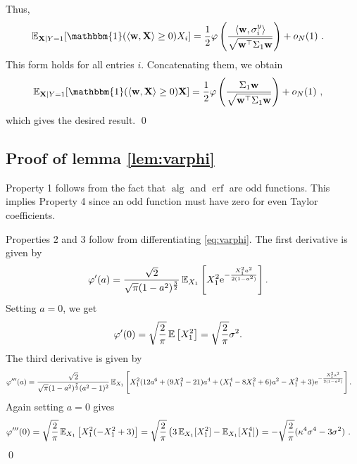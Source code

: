 Thus,
\begin{align*}
    \E_{\mathbf{X} \mid Y=1}[ \mathbbm{1}( \langle \mathbf{w}, \mathbf{X} \rangle \geq 0 ) X_i ]
    &= \frac{1}{2} \varphi \left( \frac{ \langle \mathbf{w}, \sigma_i^y \rangle }{ \sqrt{\mathbf{w}^\top \Sigma_1 \mathbf{w}} } \right) + o_N(1)~.
\end{align*}
This form holds for all entries $i$.
Concatenating them, we obtain
\begin{align*}
    \E_{\mathbf{X} \mid Y=1}[ \mathbbm{1}( \langle \mathbf{w}, \mathbf{X} \rangle \geq 0 ) \mathbf{X} ]
    &= \frac{1}{2} \varphi \left( \frac{ \Sigma_1 \mathbf{w} }{ \sqrt{\mathbf{w}^\top \Sigma_1 \mathbf{w}} } \right) + o_N(1)~,
\end{align*}
which gives the desired result.
\qed

\subsection{Proof of lemma \ref{lem:varphi}} \label{subsec:pf_of_varphi}
Property 1 follows from the fact that $\operatorname{alg}$ and $\operatorname{erf}$ are odd functions.
This implies Property 4 since an odd function must have zero for even Taylor coefficients.

Properties 2 and 3 follow from differentiating \cref{eq:varphi}.
The first derivative is given by
\begin{align*}
    \varphi'(a) &= \frac{\sqrt{2}}{{\sqrt{{\pi}}}(1-a^2)^\frac{3}{2}} \operatorname{\mathbb{E}}_{X_1}\left[ X_1^2\mathrm{e}^{-\frac{X_1^2a^2}{2(1-a^2)}} \right].
\end{align*}
Setting $a = 0$, we get
\begin{align*}
    \varphi'(0) 
    &= \sqrt{\frac{2}{\pi}} \operatorname{\mathbb{E}}\left[ X_1^2 \right]
    = \sqrt{\frac{2}{\pi}} \sigma^2.
\end{align*}
The third derivative is given by
\begin{align*}
    \varphi'''(a) &= \frac{\sqrt{2}}{\sqrt{{\pi}}(1-a^2)^\frac{7}{2}(a^2-1)^2} \operatorname{\mathbb{E}}_{X_1} \left[
    X_1^2(12a^6+(9X_1^2-21)a^4+(X_1^4-8X_1^2+6)a^2-X_1^2+3)\mathrm{e}^{-\frac{X_1^2a^2}{2(1-a^2)}}
    \right].
\end{align*}
Again setting $a = 0$ gives
\begin{align*}
    \varphi'''(0) &= \sqrt{\frac{2}{\pi}} \operatorname{\mathbb{E}}_{X_1} \left[ X_1^2(-X_1^2+3) \right]
    = \sqrt{\frac{2}{\pi}} \left( 3 \operatorname{\mathbb{E}}_{X_1}[X_1^2] - \operatorname{\mathbb{E}}_{X_1}[X_1^4] \right) 
    = -\sqrt{\frac{2}{\pi}} (\kappa^4 \sigma^4 - 3 \sigma^2)~.
\end{align*}
\qed


